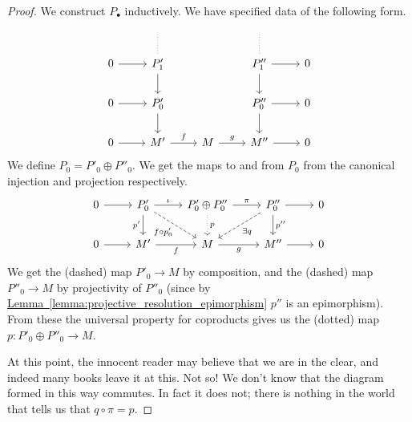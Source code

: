 \documentclass[main.tex]{subfiles}
\begin{document}
\begin{proof}
  We construct $P_{\bullet}$ inductively. We have specified data of the following form.
  \begin{equation*}
    \begin{tikzcd}
      \
      & \
      \arrow[d, dotted, no head]
      & \
      & \
      \arrow[d, dotted, no head]
      & \
      \\
      0
      \arrow[r]
      & P'_{1}
      \arrow[d]
      && P''_{1}
      \arrow[r]
      \arrow[d]
      & 0
      \\
      0
      \arrow[r]
      & P'_{0}
      \arrow[d]
      && P''_{0}
      \arrow[r]
      \arrow[d]
      & 0
      \\
      0
      \arrow[r]
      & M'
      \arrow[r, "f"]
      & M
      \arrow[r, "g"]
      & M''
      \arrow[r]
      & 0
    \end{tikzcd}
  \end{equation*}
  We define $P_{0} = P'_{0} \oplus P''_{0}$. We get the maps to and from $P_{0}$ from the canonical injection and projection respectively.
  \begin{equation*}
    \begin{tikzcd}
      0
      \arrow[r]
      & P'_{0}
      \arrow[r, "\iota"]
      \arrow[dr, dashed, swap, "f \circ p'_{0}"]
      \arrow[d, swap, "p'"]
      & P'_{0} \oplus P''_{0}
      \arrow[r, "\pi"]
      \arrow[d, dotted, "p"]
      & P''_{0}
      \arrow[r]
      \arrow[d, "p''"]
      \arrow[dl, dashed, "\exists q"]
      & 0
      \\
      0
      \arrow[r]
      & M'
      \arrow[r, swap, "f"]
      & M
      \arrow[r, swap, "g"]
      & M''
      \arrow[r]
      & 0
    \end{tikzcd}
  \end{equation*}
  We get the (dashed) map $P'_{0} \to M$ by composition, and the (dashed) map $P''_{0} \to M$ by projectivity of $P''_{0}$ (since by \hyperref[lemma:projective_resolution_epimorphism]{Lemma~\ref*{lemma:projective_resolution_epimorphism}} $p''$ is an epimorphism). From these the universal property for coproducts gives us the (dotted) map $p\colon P'_{0} \oplus P''_{0} \to M$.

  At this point, the innocent reader may believe that we are in the clear, and indeed many books leave it at this. Not so! We don't know that the diagram formed in this way commutes. In fact it does not; there is nothing in the world that tells us that $q \circ \pi = p$.


\end{proof}
\end{document}
